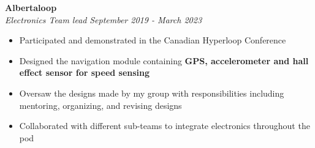 \documentclass[letterpaper,20pt]{article}
\begin{document}

    \vspace{-1pt}
        \textbf{Albertaloop}
        \vspace{2pt}
        \textit{}\\
        \textit{Electronics Team lead} \hspace{10.2cm}
        \textit{September 2019 - March 2023}
        \vspace{-5pt} 
        \hspace{-10pt}
    \begin{itemize}
        \item Participated and demonstrated in the Canadian Hyperloop Conference \vspace{-5pt}
        \item Designed the navigation module containing \textbf{GPS, accelerometer and hall effect sensor for speed sensing} \vspace{-5pt} 
        \item Oversaw the designs made by my group with responsibilities including mentoring, organizing, and revising designs \vspace{-5pt}
        \item Collaborated with different sub-teams to integrate electronics throughout the pod
    \end{itemize}

\end{document}
